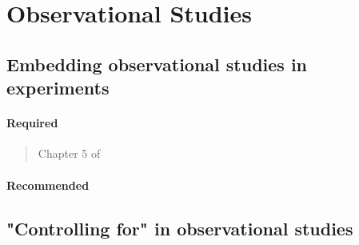 \documentclass[12pt]{article}
\begin{document}
\begin{verse}  \end{verse}

\begin{verse}  \end{verse}

\begin{verse}  \end{verse}

\begin{verse}  \end{verse}


\begin{verse}  \end{verse}


\section{Observational Studies}

\subsection{Embedding observational studies in experiments}

\paragraph*{Required}

\begin{verse} Chapter 5 of  \end{verse}

\paragraph*{Recommended}

\begin{verse}  \end{verse}

\begin{verse}  \end{verse}

\subsection{"Controlling for" in observational studies}
\end{document}
